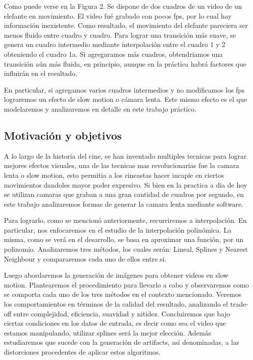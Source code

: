 Como puede verse en la Figura 2. Se dispone de dos cuadros de un video de un elefante en movimiento. El video fué grabado con pocos fps, por lo cual hay información inexistente. Como resultado, el movimiento del elefante pareciera ser menos fluido entre cuadro y cuadro. Para lograr una transición más suave, se genera un cuadro intermedio mediante interpolación entre el cuadro 1 y 2 obteniendo el cuadro 1a. Si agregaramos más cuadros, obtendriamos una transición aún más fluida, en principio, aunque en la práctica habrá factores que influirán en el resultado. 

En particular, si agregamos varios cuadros intermedios y no modificamos los fps lograremos un efecto de slow motion o cámara lenta. Este mismo efecto es el que modelaremos y analizaremos en detalle en este trabajo práctico.

\subsection{Motivación y objetivos}

A lo largo de la historia del cine, se han inventado multiples tecnicas para lograr mejores efectos visuales, una de las tecnicas mas revolucionarias fue la camara lenta o slow motion, esto permitia a los cineastas hacer incapie en ciertos movimientos dandoles mayor poder expresivo. Si bien en la practica a dia de hoy se utilizan camaras que graban a una gran cantidad de cuadros por segundo, en este trabajo analizaremos formas de generar la camara lenta mediante software.

Para lograrlo, como se mencionó anteriormente, recurriremos a interpolación.
En particular, nos enfocaremos en el estudio de la interpolación polinómica. 
La misma, como se verá en el desarrollo, se basa en aproximar una función, por un polinomio. Analizaremos tres métodos, los cuales serán:  Lineal, Splines y Nearest Neighbour y compararemos cada uno de ellos entre si.

Luego abordaremos la generación de imágenes para obtener videos en slow motion.
Plantearemos el procedimiento para llevarlo a cabo y observaremos como se comporta cada uno de los tres métodos en el contexto mencionado. Veremos los comportamientos en términos de la calidad del resultado, analizando el trade-off entre complejidad, eficiencia, suavidad y nitidez. Concluiremos que bajo ciertas condiciones en los datos de entrada, es decir como sea el video que estamos manipulando, utilizar splines será la mejor elección. 
Además estudiaremos que sucede con la generación de artifacts, así denominadas, a las distorciones procedentes de aplicar estos algoritmos.